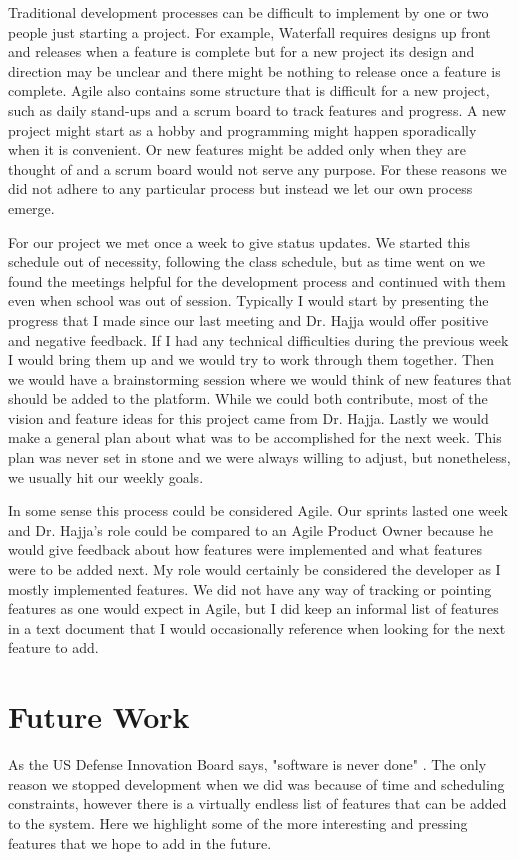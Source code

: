 \documentclass{article}
\begin{document}
    Traditional development processes can be difficult to implement by one or two people just starting a project. For example, Waterfall requires designs up front and releases when a feature is complete but for a new project its design and direction may be unclear and there might be nothing to release once a feature is complete. Agile also contains some structure that is difficult for a new project, such as daily stand-ups and a scrum board to track features and progress. A new project might start as a hobby and programming might happen sporadically when it is convenient. Or new features might be added only when they are thought of and a scrum board would not serve any purpose. For these reasons we did not adhere to any particular process but instead we let our own process emerge.
    \smallskip
    
    For our project we met once a week to give status updates. We started this schedule out of necessity, following the class schedule, but as time went on we found the meetings helpful for the development process and continued with them even when school was out of session. Typically I would start by presenting the progress that I made since our last meeting and Dr. Hajja would offer positive and negative feedback. If I had any technical difficulties during the previous week I would bring them up and we would try to work through them together. Then we would have a brainstorming session where we would think of new features that should be added to the platform. While we could both contribute, most of the vision and feature ideas for this project came from Dr. Hajja. Lastly we would make a general plan about what was to be accomplished for the next week. This plan was never set in stone and we were always willing to adjust, but nonetheless, we usually hit our weekly goals.
    \smallskip
    
    In some sense this process could be considered Agile. Our sprints lasted one week and Dr. Hajja's role could be compared to an Agile Product Owner because he would give feedback about how features were implemented and what features were to be added next. My role would certainly be considered the developer as I mostly implemented features. We did not have any way of tracking or pointing features as one would expect in Agile, but I did keep an informal list of features in a text document that I would occasionally reference when looking for the next feature to add.
    
\section{Future Work}\label{future-work}
    As the US Defense Innovation Board says, "software is never done" \cite{mcquade}. The only reason we stopped development when we did was because of time and scheduling constraints, however there is a virtually endless list of features that can be added to the system. Here we highlight some of the more interesting and pressing features that we hope to add in the future.
    \\\\
    \smallskip
    
\end{document}
